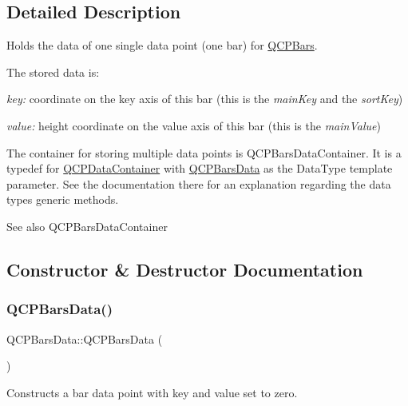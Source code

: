 \subsection{Detailed Description}
Holds the data of one single data point (one bar) for \hyperlink{class_q_c_p_bars}{Q\+C\+P\+Bars}. 

The stored data is\+: \begin{DoxyItemize}
\item {\itshape key\+:} coordinate on the key axis of this bar (this is the {\itshape main\+Key} and the {\itshape sort\+Key}) \item {\itshape value\+:} height coordinate on the value axis of this bar (this is the {\itshape main\+Value})\end{DoxyItemize}
The container for storing multiple data points is Q\+C\+P\+Bars\+Data\+Container. It is a typedef for \hyperlink{class_q_c_p_data_container}{Q\+C\+P\+Data\+Container} with \hyperlink{class_q_c_p_bars_data}{Q\+C\+P\+Bars\+Data} as the Data\+Type template parameter. See the documentation there for an explanation regarding the data type\textquotesingle{}s generic methods.

\begin{DoxySeeAlso}{See also}
Q\+C\+P\+Bars\+Data\+Container 
\end{DoxySeeAlso}


\subsection{Constructor \& Destructor Documentation}
\mbox{\label{class_q_c_p_bars_data_a800794d4c5fea22eeb8bade20798496b}} 
\subsubsection{\texorpdfstring{Q\+C\+P\+Bars\+Data()}{QCPBarsData()}\hspace{0.1cm}{\footnotesize\ttfamily [1/2]}}
{\footnotesize\ttfamily Q\+C\+P\+Bars\+Data\+::\+Q\+C\+P\+Bars\+Data (\begin{DoxyParamCaption}{ }\end{DoxyParamCaption})}

Constructs a bar data point with key and value set to zero. \mbox{\label{class_q_c_p_bars_data_a4158816a69e2c675885f48afa2b5acc9}} 
